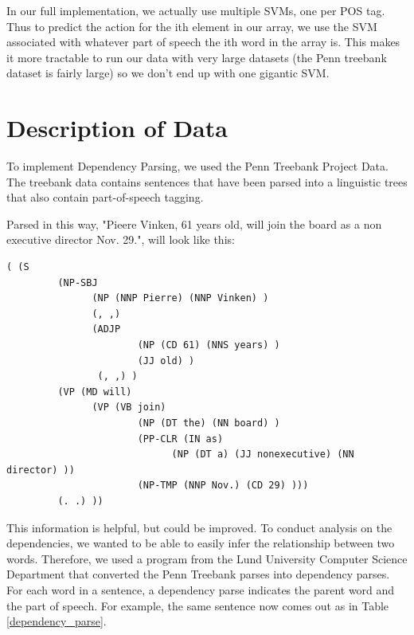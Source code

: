 \documentclass[12pt]{amsart}
\begin{document}
In our full implementation, we actually use multiple SVMs, one per POS tag.
Thus to predict the action for the ith element in our array, we use the SVM
associated with whatever part of speech the ith word in the array is. This
makes it more tractable to run our data with very large datasets (the Penn
treebank dataset is fairly large) so we don't end up with one gigantic SVM.

\section{Description of Data}
To implement Dependency Parsing, we used the Penn Treebank Project Data. The treebank data contains sentences that have been parsed into a linguistic trees that also contain part-of-speech tagging.

Parsed in this way, "Pieere Vinken, 61 years old, will join the board as a non executive director Nov. 29.", will look like this: 
\begin{verbatim}
( (S
         (NP-SBJ 
               (NP (NNP Pierre) (NNP Vinken) )
               (, ,) 
               (ADJP
                       (NP (CD 61) (NNS years) )
                       (JJ old) )
                (, ,) )
         (VP (MD will) 
               (VP (VB join) 
                       (NP (DT the) (NN board) )
                       (PP-CLR (IN as) 
                             (NP (DT a) (JJ nonexecutive) (NN director) ))
                       (NP-TMP (NNP Nov.) (CD 29) )))
         (. .) ))\end{verbatim}

This information is helpful, but could be improved. To conduct analysis on the dependencies, we wanted to be able to easily infer the relationship between two words. Therefore, we used a program from the Lund University Computer Science Department that converted the Penn Treebank parses into dependency parses. For each word in a sentence, a dependency parse indicates the parent word and the part of speech. For example, the same sentence now comes out as in Table \ref{dependency_parse}.
\end{document}
